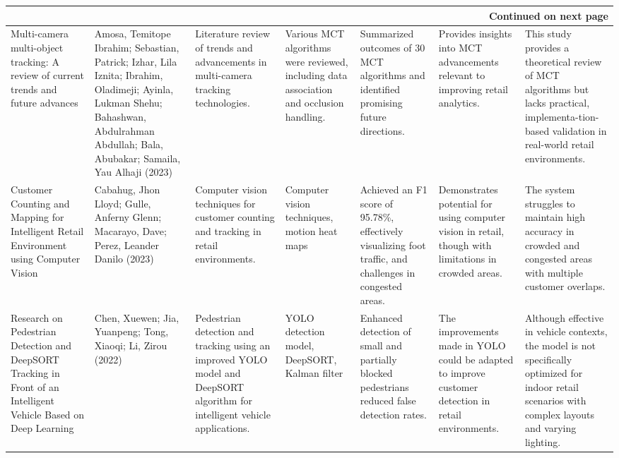 {\begin{landscape}
\begin{longtable}{|p{2.5cm}|p{2.5cm}|p{2.7cm}|p{2.7cm}|p{2.5cm}|p{2.5cm}|p{2.5cm}|}
		\hline 
		\multicolumn{7}{|r|}{{Continued on next page}} \\ 
		\hline
		\endfoot
		
		\hline
		\endlastfoot
		
		Multi-camera multi-object tracking: A review of current trends and future advances
		& Amosa, Temitope Ibrahim; Sebastian, Patrick; Izhar, Lila Iznita; Ibrahim, Oladimeji; Ayinla, Lukman Shehu; Bahashwan, Abdulrahman Abdullah; Bala, Abubakar; Samaila, Yau Alhaji (2023)
		& Literature review of trends and advancements in multi-camera tracking technologies.
		& Various MCT algorithms were reviewed, including data association and occlusion handling.
		& Summarized outcomes of 30 MCT algorithms and identified promising future directions.
		& Provides insights into MCT advancements relevant to improving retail analytics.
		& This study provides a theoretical review of MCT algorithms but lacks practical, implementa-\newline tion-based validation in real-world retail environments.\\
		\hline
		
		Customer Counting and Mapping for Intelligent Retail Environment using Computer Vision
		& Cabahug, Jhon Lloyd; Gulle, Anferny Glenn; Macarayo, Dave; Perez, Leander Danilo (2023)
		& Computer vision techniques for customer counting and tracking in retail environments.
		& Computer vision techniques, motion heat maps
		& Achieved an F1 score of 95.78\%, effectively visualizing foot traffic, and challenges in congested areas.
		& Demonstrates potential for using computer vision in retail, though with limitations in crowded areas.
		& The system struggles to maintain high accuracy in crowded and congested areas with multiple customer overlaps. \\
		\hline
		
		Research on Pedestrian Detection and DeepSORT Tracking in Front of an Intelligent Vehicle Based on Deep Learning
		& Chen, Xuewen; Jia, Yuanpeng; Tong, Xiaoqi; Li, Zirou (2022)
		& Pedestrian detection and tracking using an improved YOLO model and DeepSORT algorithm for intelligent vehicle applications.
		& YOLO detection model, DeepSORT, Kalman filter
		& Enhanced detection of small and partially blocked pedestrians reduced false detection rates.
		& The improvements made in YOLO could be adapted to improve customer detection in retail environments.
		& Although effective in vehicle contexts, the model is not specifically optimized for indoor retail scenarios with complex layouts and varying lighting. \\
		\hline
		

\end{longtable}
\end{landscape}}
